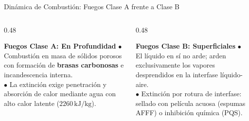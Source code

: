 \begin{frame}{Dinámica de Combustión: Fuegos Clase A frente a Clase B}
  \begin{columns}[T]
    \begin{column}{0.48\textwidth}
      \begin{block}{\textbf{Fuegos Clase A: En Profundidad}}
        \small
        $\bullet$ Combustión en masa de sólidos porosos con formación de \textbf{brasas carbonosas} e incandescencia interna.\\
        $\bullet$ La extinción exige penetración y absorción de calor mediante agua con alto calor latente ($2260\,\mathrm{kJ/kg}$).
      \end{block}
      \vspace{0.2cm}
      \centering
    \end{column}

    \begin{column}{0.48\textwidth}
      \begin{block}{\textbf{Fuegos Clase B: Superficiales}}
        \small
        $\bullet$ El líquido en sí no arde; arden exclusivamente los vapores desprendidos en la interfase líquido-aire.\\
        $\bullet$ Extinción por rotura de interfase: sellado con película acuosa (espumas AFFF) o inhibición química (PQS).
      \end{block}
      \vspace{0.2cm}
      \centering
    \end{column}
  \end{columns}
\end{frame}

